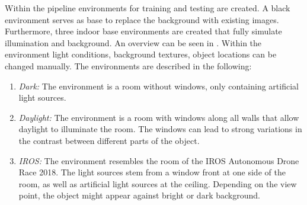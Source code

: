 Within the pipeline environments for training and testing are created. A black environment serves as base to replace the background with existing images. Furthermore, three indoor base environments are created that fully simulate illumination and background. An overview can be seen in . Within the environment light conditions, background textures, object locations can be changed manually. The environments are described in the following:

\begin{enumerate}
	\item \textit{Dark:} The environment is a room without windows, only containing artificial light sources. 
	\item \textit{Daylight:} The environment is a room with windows along all walls that allow daylight to illuminate the room. The windows can lead to strong variations in the contrast between different parts of the object.
	\item \textit{IROS:} The environment resembles the room of the \ac{IROS} Autonomous Drone Race 2018. The light sources stem from a window front at one side of the room, as well as artificial light sources at the ceiling. Depending on the view point, the object might appear against bright or dark background.
\end{enumerate}

